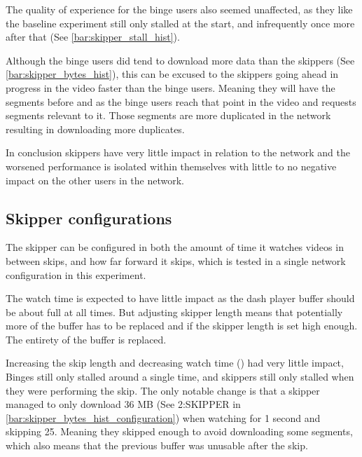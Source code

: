 \if{}

\fi

The quality of experience for the binge users also seemed unaffected, as they like the baseline experiment still only stalled at the start, and infrequently once more after that (See \autoref{bar:skipper_stall_hist}). 

\if{}

\fi


Although the binge users did tend to download more data than the skippers (See \autoref{bar:skipper_bytes_hist}), this can be excused to the skippers going ahead in progress in the video faster than the binge users. Meaning they will have the segments before and as the binge users reach that point in the video and requests segments relevant to it. Those segments are more duplicated in the network resulting in downloading more duplicates.

\if{}

\fi


In conclusion skippers have very little impact in relation to the network and the worsened performance is isolated within themselves with little to no negative impact on the other users in the network.

\subsection{Skipper configurations}
The skipper can be configured in both the amount of time it watches videos in between skips, and how far forward it skips, which is tested in a single network configuration in this experiment.

The watch time is expected to have little impact as the dash player buffer should be about full at all times. But adjusting skipper length means that potentially more of the buffer has to be replaced and if the skipper length is set high enough. The entirety of the buffer is replaced. %

Increasing the skip length and decreasing watch time () had very little impact, Binges still only stalled around a single time, and skippers still only stalled when they were performing the skip. The only notable change is that a skipper managed to only download 36 \ac{MB} (See 2:SKIPPER in \autoref{bar:skipper_bytes_hist_configuration}) when watching for 1 second and skipping 25. Meaning they skipped enough to avoid downloading some segments, which also means that the previous buffer was unusable after the skip. 


